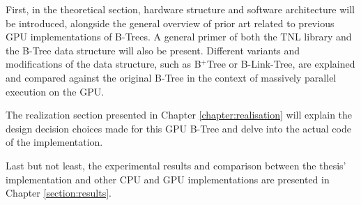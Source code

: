 First, in the theoretical section, hardware structure and software architecture will be introduced, alongside the general overview of prior art related to previous GPU implementations of B-Trees. A general primer of both the TNL library and the B-Tree data structure will also be present. Different variants and modifications of the data structure, such as B$^+$Tree or B-Link-Tree, are explained and compared against the original B-Tree in the context of massively parallel execution on the GPU.

The realization section presented in Chapter \ref{chapter:realisation} will explain the design decision choices made for this GPU B-Tree and delve into the actual code of the implementation.

Last but not least, the experimental results and comparison between the thesis' implementation and other CPU and GPU implementations are presented in Chapter \ref{section:results}.